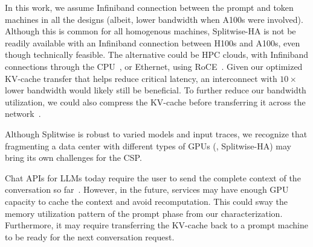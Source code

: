 In this work, we assume Infiniband connection between the prompt and token machines in all the designs (albeit, lower bandwidth when A100s were involved).
Although this is common for all homogenous machines, Splitwise-HA is not be readily available with an Infiniband connection between H100s and A100s, even though technically feasible.
The alternative could be HPC clouds, with Infiniband connections through the CPU~\cite{azurehpcvm}, or Ethernet, using RoCE~\cite{roce}.
Given our optimized KV-cache transfer that helps reduce critical latency, an interconnect with $10\times$ lower bandwidth would likely still be beneficial.
To further reduce our bandwidth utilization, we could also compress the KV-cache before transferring it across the network~\cite{liu2023deja}.

Although Splitwise is robust to varied models and input traces, we recognize that fragmenting a data center with different types of GPUs (\eg, Splitwise-HA) may bring its own challenges for the CSP.

Chat APIs for LLMs today require the user to send the complete context of the conversation so far~\cite{chatgptapi}.
However, in the future, services may have enough GPU capacity to cache the context and avoid recomputation.
This could sway the memory utilization pattern of the prompt phase from our characterization.
Furthermore, it may require transferring the KV-cache back to a prompt machine to be ready for the next conversation request.
